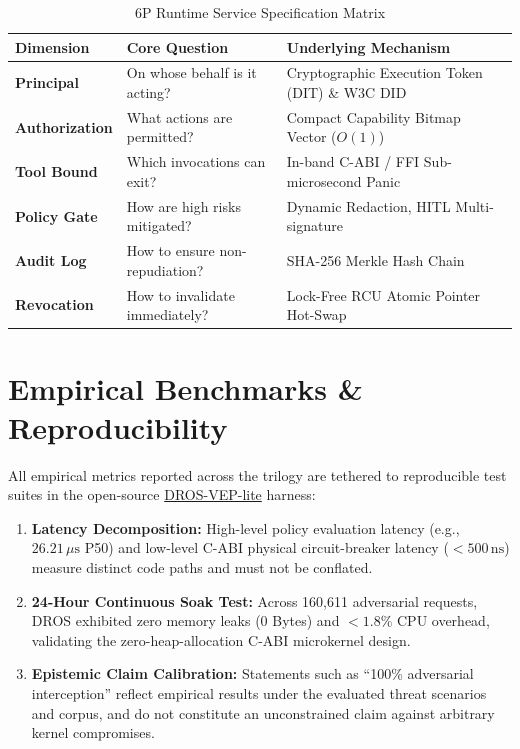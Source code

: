 \documentclass[conference]{IEEEtran}
\begin{document}
\begin{table}[h]
\caption{6P Runtime Service Specification Matrix}
\label{tab:6p_matrix_en}
\centering
\footnotesize
\renewcommand{\arraystretch}{1.3}
\begin{tabularx}{\columnwidth}{l Y Y}
\toprule
\textbf{Dimension} & \textbf{Core Question} & \textbf{Underlying Mechanism} \\
\midrule
\textbf{Principal} & On whose behalf is it acting? & Cryptographic Execution Token (DIT) \& W3C DID \\
\textbf{Authorization} & What actions are permitted? & Compact Capability Bitmap Vector ($O(1)$) \\
\textbf{Tool Bound} & Which invocations can exit? & In-band C-ABI / FFI Sub-microsecond Panic \\
\textbf{Policy Gate} & How are high risks mitigated? & Dynamic Redaction, HITL Multi-signature \\
\textbf{Audit Log} & How to ensure non-repudiation? & SHA-256 Merkle Hash Chain \\
\textbf{Revocation} & How to invalidate immediately? & Lock-Free RCU Atomic Pointer Hot-Swap \\
\bottomrule
\end{tabularx}
\end{table}

\section{Empirical Benchmarks \& Reproducibility}
All empirical metrics reported across the trilogy are tethered to reproducible test suites in the open-source \href{https://github.com/Top-Celestial-Company-Ltd/DROS-VEP-lite}{DROS-VEP-lite} harness:
\begin{enumerate}
    \item \textbf{Latency Decomposition:} High-level policy evaluation latency (e.g., $26.21\,\mu\mathrm{s}$ P50) and low-level C-ABI physical circuit-breaker latency ($<500\,\mathrm{ns}$) measure distinct code paths and must not be conflated.
    \item \textbf{24-Hour Continuous Soak Test:} Across 160,611 adversarial requests, DROS exhibited zero memory leaks (0 Bytes) and $<1.8\%$ CPU overhead, validating the zero-heap-allocation C-ABI microkernel design.
    \item \textbf{Epistemic Claim Calibration:} Statements such as ``100\% adversarial interception'' reflect empirical results under the evaluated threat scenarios and corpus, and do not constitute an unconstrained claim against arbitrary kernel compromises.
\end{enumerate}
\end{document}
